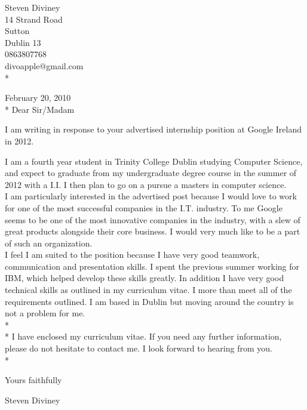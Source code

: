 \documentclass{res}
\begin{document}
 

\begin{flushright}
   Steven Diviney \\
   14 Strand Road \\
   Sutton \\
   Dublin 13 \\
   0863807768 \\
   divoapple@gmail.com \\* \vspace{10 mm}
\end{flushright}
\begin{flushleft}
 
February 20, 2010\\*\vspace{10 mm}
Dear Sir/Madam
\end{flushleft}
I am writing in response to your advertised internship position at Google Ireland in 2012.

I am a fourth year student in Trinity College Dublin studying Computer Science, and expect to graduate from my undergraduate degree course in the summer of 2012 with a I.I. I then plan to go on a pursue a masters in computer science.\\
I am particularly interested in the advertised post because I would love to work for one of the most successful companies in the I.T. industry. To me Google seems to be one of the most innovative companies in the industry, with a slew of great products alongside their core business. I would very much like to be a part of such an organization.\\
I feel I am suited to the position because I have very good teamwork, communication and presentation skills. I spent the previous summer working for IBM, which helped develop these skills greatly. In addition I have very good technical skills as outlined in my curriculum vitae. I more than meet all of the requirements outlined. I am based in Dublin but moving around the country is not a problem for me.
\\*
\\*
I have enclosed my curriculum vitae. If you need any further information, please do not hesitate to contact me. I look forward to hearing from you.\\*

\begin{flushleft}
Yours faithfully\\\vspace{10mm}

Steven Diviney\\
\end{flushleft}
\end{document}
